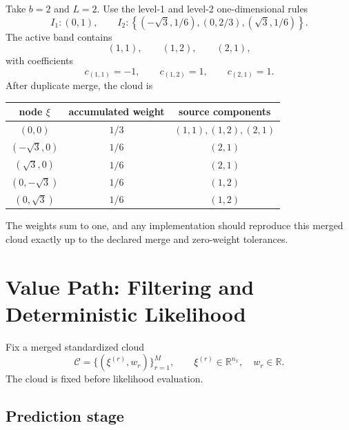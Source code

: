 \documentclass[11pt]{article}
\numberwithin{equation}{section}
\newcommand{\R}{\mathbb R}
\begin{document}
Take \(b=2\) and \(L=2\).  Use the level-1 and level-2 one-dimensional rules
\begin{equation}
  I_1:(0,1),
  \qquad
  I_2:\left\{(-\sqrt3,1/6),(0,2/3),(\sqrt3,1/6)\right\}.
  \label{eq:toy-rules}
\end{equation}
The active band contains
\begin{equation}
  (1,1),\qquad (1,2),\qquad (2,1),
  \label{eq:toy-indices}
\end{equation}
with coefficients
\begin{equation}
  c_{(1,1)}=-1,
  \qquad
  c_{(1,2)}=1,
  \qquad
  c_{(2,1)}=1.
  \label{eq:toy-coeffs}
\end{equation}
After duplicate merge, the cloud is
\begin{center}
\begin{tabular}{ccc}
\toprule
node \(\xi\) & accumulated weight & source components \\
\midrule
\((0,0)\) & \(1/3\) & \((1,1),(1,2),(2,1)\) \\
\(( -\sqrt3,0 )\) & \(1/6\) & \((2,1)\) \\
\(( \sqrt3,0 )\) & \(1/6\) & \((2,1)\) \\
\((0,-\sqrt3)\) & \(1/6\) & \((1,2)\) \\
\((0,\sqrt3)\) & \(1/6\) & \((1,2)\) \\
\bottomrule
\end{tabular}
\end{center}
The weights sum to one, and any implementation should reproduce this merged
cloud exactly up to the declared merge and zero-weight tolerances.

\section{Value Path: Filtering and Deterministic Likelihood}
\label{sec:value-path}

Fix a merged standardized cloud
\begin{equation}
  \mathcal C=\{(\xi^{(r)},w_r)\}_{r=1}^M,
  \qquad
  \xi^{(r)}\in\R^{n_x},
  \quad
  w_r\in\R.
  \label{eq:cloud-for-filter}
\end{equation}
The cloud is fixed before likelihood evaluation.

\subsection{Prediction stage}
\end{document}
